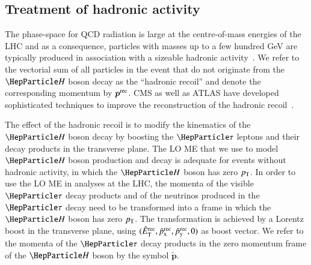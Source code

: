 \subsection{Treatment of hadronic activity}
\label{sec:mem_hadRecoil}

The phase-space for QCD radiation is large at the centre-of-mass
energies of the LHC
and as a consequence, particles with masses up to a few hundred GeV 
are typically produced in association with a sizeable hadronic activity~\cite{Alwall:2010cq}.
We refer to the vectorial sum of all particles in the event that do not originate from the $\PHiggs$ boson decay
as the ``hadronic recoil'' and denote the corresponding momentum by $\bm{p}^{\textrm{rec}}$.
CMS as well as ATLAS have developed sophisticated techniques to improve the reconstruction 
of the hadronic recoil~\cite{CMS-JME-13-003,ATLAS-CONF-2014-019}.

The effect of the hadronic recoil is to modify the kinematics of the $\PHiggs$ boson decay
by boosting the $\Pgt$ leptons and their decay products in the transverse plane.
The LO ME that we use to model $\PHiggs$ boson production and decay
is adequate for events without hadronic activity,
in which the $\PHiggs$ boson has zero $p_{\textrm{T}}$.
In order to use the LO ME in analyses at the LHC,
the momenta of the visible $\Pgt$ decay products and of the neutrinos produced in the $\Pgt$ decay
need to be transformed into a frame in which the $\PHiggs$ boson has zero $p_{\textrm{T}}$.
The transformation is achieved by a Lorentz boost in the transverse plane,
using $(\hat{E}_{\textrm{T}}^{\textrm{rec}}, \hat{p}_{\textrm{x}}^{\textrm{rec}}, \hat{p}_{\textrm{y}}^{\textrm{rec}}, 0)$ as boost vector.
We refer to the momenta of the $\Pgt$ decay products in the zero
momentum frame of the $\PHiggs$ boson by the symbol $\bm{\tilde{p}}$.

